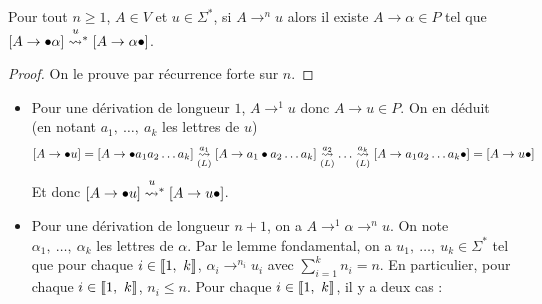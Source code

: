\documentclass[../../agregation.tex]{subfiles}
\begin{document}
\begin{lem}
	Pour tout $n\ge1$, $A\in V$ et $u\in\Sigma^{*}$, si $A\to^{n}u$
	alors il existe $A\to\alpha\in P$ tel que $\left[A\to\bullet\alpha\right]\transitionn u*\left[A\to\alpha\bullet\right]$.\label{lem:regle}\end{lem}
\begin{proof}
	On le prouve par récurrence forte sur $n$.\end{proof}
\begin{itemize}
	\item Pour une dérivation de longueur $1$, $A\to^{1}u$ donc $A\to u\in P$.
	On en déduit (en notant $a_{1},\ \dots,\ a_{k}$ les lettres de $u$)
	\[
	\left[A\to\bullet u\right]=\left[A\to\bullet a_{1}a_{2}\dots a_{k}\right]\underset{(L)}{\overset{a_{1}}{\leadsto}}\left[A\to a_{1}\bullet a_{2}\dots a_{k}\right]\underset{(L)}{\overset{a_{2}}{\leadsto}}\dots\underset{(L)}{\overset{a_{k}}{\leadsto}}\left[A\to a_{1}a_{2}\dots a_{k}\bullet\right]=\left[A\to u\bullet\right]
	\]
	Et donc $\left[A\to\bullet u\right]\transitionn u*\left[A\to u\bullet\right]$.
	\item Pour une dérivation de longueur $n+1$, on a $A\to^{1}\alpha\to^{n}u$.
	On note $\alpha_{1},\ \dots,\ \alpha_{k}$ les lettres de $\alpha$.
	Par le lemme fondamental, on a $u_{1},\ \dots,\ u_{k}\in\Sigma^{*}$
	tel que pour chaque $i\in\left\llbracket 1,\ k\right\rrbracket$, $\alpha_{i}\to^{n_{i}}u_{i}$
	avec ${\displaystyle \sum_{i=1}^{k}}n_{i}=n$. En particulier, pour
	chaque $i\in\left\llbracket 1,\ k\right\rrbracket$, $n_{i}\le n$. Pour chaque $i\in\left\llbracket 1,\ k\right\rrbracket$,
	il y a deux cas :
	

\end{itemize}
\end{document}
